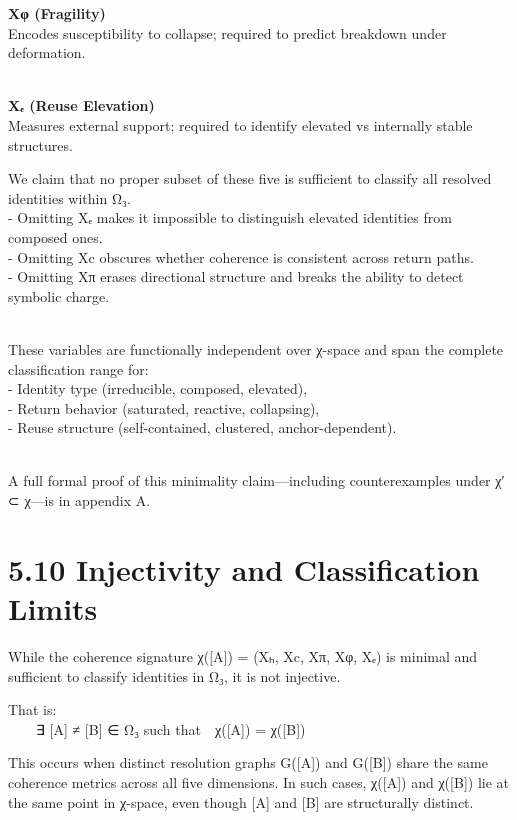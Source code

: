\textbf{Xφ (Fragility)}\\
Encodes susceptibility to collapse; required to predict breakdown under
deformation.\\
\strut \\
\textbf{Xₑ (Reuse Elevation)}\\
Measures external support; required to identify elevated vs internally
stable structures.

We claim that no proper subset of these five is sufficient to classify
all resolved identities within Ω₃.\\
- Omitting Xₑ makes it impossible to distinguish elevated identities
from composed ones.\\
- Omitting Xc obscures whether coherence is consistent across return
paths.\\
- Omitting Xπ erases directional structure and breaks the ability to
detect symbolic charge.\\
\strut \\
These variables are functionally independent over χ-space and span the
complete classification range for:\\
- Identity type (irreducible, composed, elevated),\\
- Return behavior (saturated, reactive, collapsing),\\
- Reuse structure (self-contained, clustered, anchor-dependent).\\
\strut \\
A full formal proof of this minimality claim---including counterexamples
under χ′ ⊂ χ---is in appendix A.

\section{5.10 \textbar{} Injectivity and Classification
Limits}\label{injectivity-and-classification-limits}

While the coherence signature χ({[}A{]}) = (Xₕ, Xc, Xπ, Xφ, Xₑ) is
minimal and sufficient to classify identities in Ω₃, it is not
injective.

That is:\\
  ∃ {[}A{]} ≠ {[}B{]} ∈ Ω₃ such that χ({[}A{]}) = χ({[}B{]})

This occurs when distinct resolution graphs G({[}A{]}) and G({[}B{]})
share the same coherence metrics across all five dimensions. In such
cases, χ({[}A{]}) and χ({[}B{]}) lie at the same point in χ-space, even
though {[}A{]} and {[}B{]} are structurally distinct.

